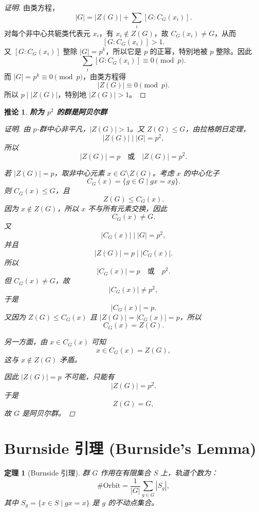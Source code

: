 \documentclass[11pt,a4paper]{ctexart}
\newtheorem*{theorem}{定理}
\newtheorem*{corollary}{推论}
\theoremstyle{remark}
\begin{document}
\begin{proof}[证明]
由类方程，
\[
|G|=|Z(G)|+\sum_i [G:C_G(x_i)].
\]
对每个非中心共轭类代表元 \(x_i\)，有 \(x_i\notin Z(G)\)，故 \(C_G(x_i)\neq G\)，从而
\[
[G:C_G(x_i)]>1.
\]
又 \([G:C_G(x_i)]\) 整除 \(|G|=p^k\)，所以它是 \(p\) 的正幂，特别地被 \(p\) 整除。因此
\[
\sum_i [G:C_G(x_i)]\equiv 0\pmod p.
\]
而 \(|G|=p^k\equiv 0\pmod p\)，由类方程得
\[
|Z(G)|\equiv 0\pmod p.
\]
所以 \(p\mid |Z(G)|\)，特别地 \(|Z(G)|>1\)。
\end{proof}

\begin{corollary}\textbf{阶为 \(p^2\) 的群是阿贝尔群}

\begin{proof}[证明]
由 \(p\)-群中心非平凡，\(|Z(G)|>1\)。又 \(Z(G)\le G\)，由拉格朗日定理，
\[
|Z(G)|\mid |G|=p^2,
\]
所以
\[
|Z(G)|=p \quad \text{或} \quad |Z(G)|=p^2.
\]

若 \(|Z(G)|=p\)，取非中心元素 \(x\in G\setminus Z(G)\)。考虑 \(x\) 的中心化子
\[
C_G(x)=\{g\in G\mid gx=xg\}.
\]
则 \(C_G(x)\le G\)，且
\[
Z(G)\le C_G(x).
\]
因为 \(x\notin Z(G)\)，所以 \(x\) 不与所有元素交换，因此
\[
C_G(x)\neq G.
\]
又
\[
|C_G(x)|\mid |G|=p^2,
\]
并且
\[
|Z(G)|=p\mid |C_G(x)|.
\]
所以
\[
|C_G(x)|=p \quad \text{或} \quad p^2.
\]
但 \(C_G(x)\neq G\)，故
\[
|C_G(x)|\neq p^2,
\]
于是
\[
|C_G(x)|=p.
\]
又因为 \(Z(G)\le C_G(x)\) 且 \(|Z(G)|=|C_G(x)|=p\)，所以
\[
C_G(x)=Z(G).
\]

另一方面，由 \(x\in C_G(x)\) 可知
\[
x\in C_G(x)=Z(G),
\]
这与 \(x\notin Z(G)\) 矛盾。

因此 \(|Z(G)|=p\) 不可能，只能有
\[
|Z(G)|=p^2.
\]
于是
\[
Z(G)=G,
\]
故 \(G\) 是阿贝尔群。
\end{proof}
\end{corollary}

\section*{Burnside 引理 (Burnside's Lemma)}

\begin{theorem}[Burnside 引理]
群 \(G\) 作用在有限集合 \(S\) 上，轨道个数为：
\[
\#\mathrm{Orbit} = \frac{1}{|G|} \sum_{g \in G} |S_g|,
\]
其中 \(S_g = \{x \in S \mid gx = x\}\) 是 \(g\) 的不动点集合。
\end{theorem}
\end{document}
